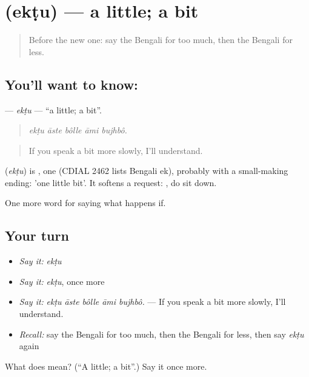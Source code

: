 \section[\texorpdfstring{\bn{একটু} (ekṭu)}{একটু (ekṭu)}]{ (ekṭu) — a little; a bit}

\label{lesson:BN-C370-ektu}



\begin{quote}
Before the new one: say the Bengali for too much, then the Bengali for less.
\end{quote}

\subsection*{You'll want to know: }
\textbf{} — \emph{ekṭu} — \textquotedblleft{}a little; a bit\textquotedblright{}.

\begin{quote}
    
\end{quote}

\begin{quote}
\emph{ekṭu āste bôlle āmi bujhbô.}
\end{quote}

\begin{quote}
If you speak a bit more slowly, I'll understand.
\end{quote}

\begin{cousinweb}
\textbf{} (\emph{ekṭu}) is , one (CDIAL 2462 lists Bengali ek), probably with a small-making ending: 'one little bit'. It softens a request:  , do sit down.
\end{cousinweb}

\begin{grammarlens}[title={What you've built}]
One more word for saying what happens if.
\end{grammarlens}

\subsection*{Your turn}
\begin{itemize}
\raggedright
  \item \emph{Say it:} \emph{ekṭu}
  \item \emph{Say it:} \emph{ekṭu}, once more
  \item \emph{Say it:} \emph{ekṭu āste bôlle āmi bujhbô.} — If you speak a bit more slowly, I'll understand.
  \item \emph{Recall:} say the Bengali for too much, then the Bengali for less, then say \emph{ekṭu} again
\end{itemize}

\begin{tcolorbox}[breakable,colback=teal!4,colframe=teal!35!black,title={Before you move on}]
What does  mean? (\textquotedblleft{}A little; a bit\textquotedblright{}.) Say it once more.
\end{tcolorbox}
